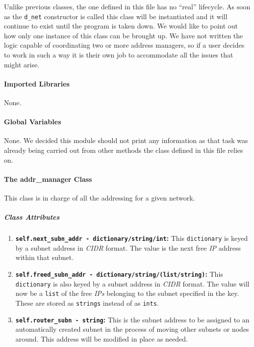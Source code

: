     Unlike previous classes, the one defined in this file has no ``real'' lifecycle. As soon as the \texttt{d\_net} constructor is called this class will be instantiated and it will continue to exist until the program is taken down. We would like to point out how only one instance of this class can be brought up. We have not written the logic capable of coordinating two or more address managers, so if a user decides to work in such a way it is their own job to accommodate all the issues that might arise.\\

    \paragraph{Imported Libraries}
        None.

    \paragraph{Global Variables}
        None. We decided this module should not print any information as that task was already being carried out from other methods the class defined in this file relies on.

    \paragraph{The addr\_manager Class}
        This class is in charge of all the addressing for a given network.

        \subparagraph{Class Attributes}
            \begin{enumerate}
                \item \textbf{\texttt{self.next\_subn\_addr - dictionary/string/int}:} This \texttt{dictionary} is keyed by a subnet address in \textit{CIDR} format. The value is the next free \textit{IP} address within that subnet.
                \item \textbf{\texttt{self.freed\_subn\_addr - dictionary/string/(list/string)}:} This \texttt{dictionary} is also keyed by a subnet address in \textit{CIDR} format. The value will now be a \texttt{list} of the free \textit{IPs} belonging to the subnet specified in the key. These are stored as \texttt{strings} instead of as \texttt{ints}.
                \item \textbf{\texttt{self.router\_subn - string}:} This is the subnet address to be assigned to an automatically created subnet in the process of moving other subnets or nodes around. This address will be modified in place as needed.
            \end{enumerate}

